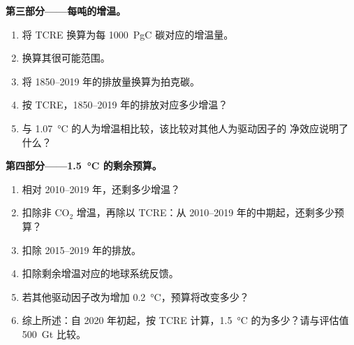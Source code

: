 \begin{problem}
\noindent\textbf{第三部分——每吨的增温。}
\begin{enumerate}[resume]
  \item 将 TCRE 换算为每 \qty{1000}{PgC} 碳对应的增温量。
  \item 换算其很可能范围。
  \item 将 1850--2019 年的排放量换算为拍克碳。
  \item 按 TCRE，1850--2019 年的排放对应多少增温？
  \item 与 \qty{1.07}{\celsius} 的人为增温相比较，该比较对其他人为驱动因子的
        净效应说明了什么？
\end{enumerate}

\noindent\textbf{第四部分——\qty{1.5}{\celsius} 的剩余预算。}
\begin{enumerate}[resume]
  \item 相对 2010--2019 年，还剩多少增温？
  \item 扣除非 CO$_2$ 增温，再除以 TCRE：从
        2010--2019 年的中期起，还剩多少预算？
  \item 扣除 2015--2019 年的排放。
  \item 扣除剩余增温对应的地球系统反馈。
  \item 若其他驱动因子改为增加 \qty{0.2}{\celsius}，预算将改变多少？
  \item 综上所述：自
        2020 年初起，按 TCRE 计算，\qty{1.5}{\celsius} 的为多少？请与评估值 \qty{500}{Gt} 比较。
\end{enumerate}
\end{problem}
